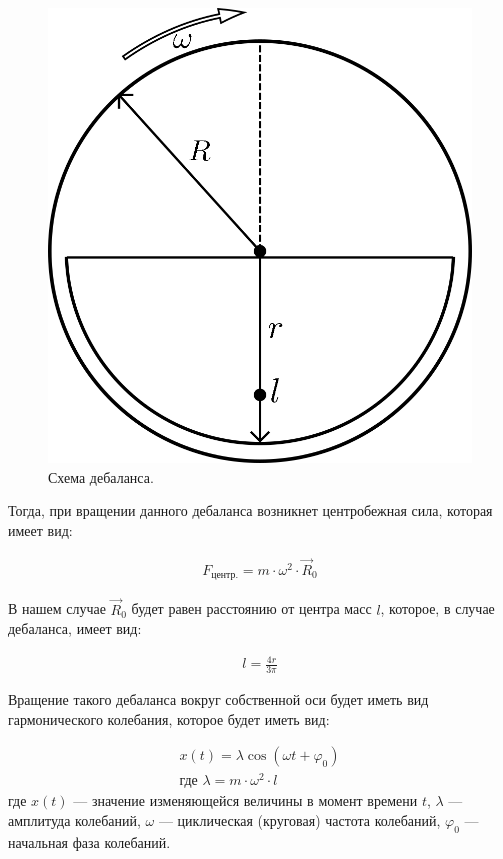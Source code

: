 \begin{figure}[h]
    \centering
    \includegraphics[width=0.4\linewidth]{img/debalance.png}
    \caption{Схема дебаланса.}
    \label{fig:debalance}
\end{figure}

Тогда, при вращении данного дебаланса возникнет центробежная сила, которая имеет вид:

\begin{equation}\label{eq:centrifugal}
    \begin{gathered}
        F_{\textrm{центр.}} = m \cdot \omega^2 \cdot \vec{R}_0
    \end{gathered}
\end{equation}

В нашем случае $\vec{R}_0$ будет равен расстоянию от центра масс $l$, которое, в случае дебаланса, имеет вид:

\begin{equation}\label{eq:distance_mass}
    \begin{gathered}
        l = \frac{4 r}{3 \pi}
    \end{gathered}
\end{equation}

Вращение такого дебаланса вокруг собственной оси будет иметь вид гармонического колебания, которое будет иметь вид:

\begin{equation}\label{eq:harmonic}
    \begin{gathered}
        x(t) = \lambda \cos (\omega t + \varphi_0) \\
        \textrm{где } \lambda = m \cdot \omega^2 \cdot l
    \end{gathered}
\end{equation}
\noindent где $x(t)$  — значение изменяющейся величины в момент времени $t$, $\lambda$ — амплитуда колебаний,
$\omega$ — циклическая (круговая) частота колебаний, $\varphi_0$ — начальная фаза колебаний.

